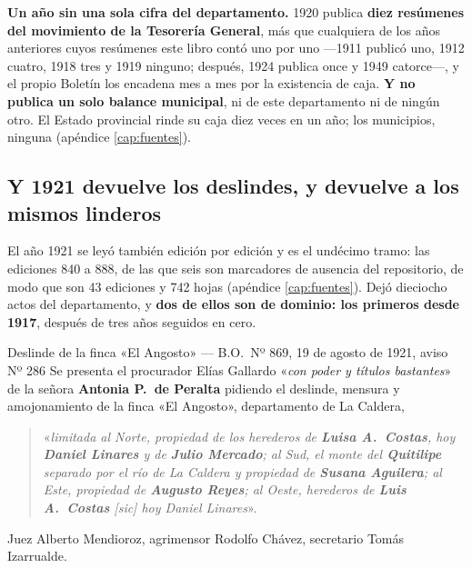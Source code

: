 \begin{cautela}
\textbf{Un año sin una sola cifra del departamento.} 1920 publica \textbf{diez resúmenes del
movimiento de la Tesorería General}, más que cualquiera de los años anteriores cuyos resúmenes este
libro contó uno por uno ---1911 publicó uno, 1912 cuatro, 1918 tres y 1919 ninguno; después, 1924
publica once y 1949 catorce---, y el propio Boletín los encadena mes a mes por la existencia de caja. \textbf{Y
no publica un solo balance municipal}, ni de este departamento ni de ningún otro. El Estado
provincial rinde su caja diez veces en un año; los municipios, ninguna (apéndice
\ref{cap:fuentes}).
\end{cautela}

\subsection*{Y 1921 devuelve los deslindes, y devuelve a los mismos linderos}

El año 1921 se leyó también edición por edición y es el undécimo tramo: las ediciones 840 a 888,
de las que seis son marcadores de ausencia del repositorio, de modo que son 43 ediciones y 742
hojas (apéndice \ref{cap:fuentes}). Dejó dieciocho actos del departamento, y \textbf{dos de ellos
son de dominio: los primeros desde 1917}, después de tres años seguidos en cero.

\begin{ficha}{Deslinde de la finca «El Angosto» --- B.O.\ Nº 869, 19 de agosto de 1921, aviso Nº 286}
Se presenta el procurador Elías Gallardo «\textit{con poder y títulos bastantes}» de la señora
\textbf{Antonia P.\ de Peralta} pidiendo el deslinde, mensura y amojonamiento de la finca «El
Angosto», departamento de La Caldera,

\begin{quote}
«\textit{limitada al Norte, propiedad de los herederos de \textbf{Luisa A.\ Costas}, hoy
\textbf{Daniel Linares} y de \textbf{Julio Mercado}; al Sud, el monte del \textbf{Quitilipe}
separado por el río de La Caldera y propiedad de \textbf{Susana Aguilera}; al Este, propiedad de
\textbf{Augusto Reyes}; al Oeste, herederos de \textbf{Luis A.\ Costas} \textit{[sic]} hoy Daniel
Linares}».
\end{quote}

Juez Alberto Mendioroz, agrimensor Rodolfo Chávez, secretario Tomás Izarrualde.
\end{ficha}

